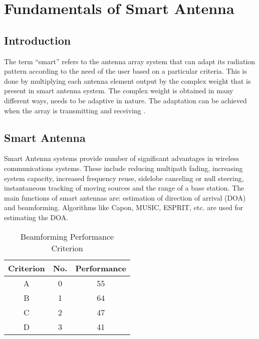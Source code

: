 \pagestyle{fancy}
\fancyhf{}
\rfoot{\thepage}
\chapter{Fundamentals of Smart Antenna}

\section{Introduction}
The term \enquote{smart} refers to the antenna array system that can adapt its radiation pattern according to the need of the user based on a particular criteria. This is done by multiplying each antenna element output by the complex weight that is present in smart antenna system. The complex weight is obtained in many different ways, needs to be adaptive in nature. The adaptation can be achieved when the array is transmitting and receiving \cite{ADR1}.

\section{Smart Antenna}

Smart Antenna systems provide number of significant advantages in wireless communications systems. These include reducing multipath fading, increasing system capacity, increased frequency reuse, sidelobe canceling or null steering, instantaneous tracking of moving sources and the range of a base station. The main functions of smart antennas are: estimation of direction of arrival (DOA) and  beamforming. Algorithms like Capon, MUSIC, ESPRIT, etc. are used for estimating the DOA\cite{ADR1}.


\begin{table}
\begin{center}{\bf \caption{Beamforming Performance Criterion}}
\vspace{1cm}
\begin{tabular}{ |c|c|c| }
\hline
Criterion & No. & Performance \\ \hline 
A & 0 & 55 \\ \hline
B & 1 &  64 \\ \hline
 C& 2 & 47  \\ \hline
 D& 3 & 41 \\
\hline
\end{tabular} 

\end{center}
\end{table}





